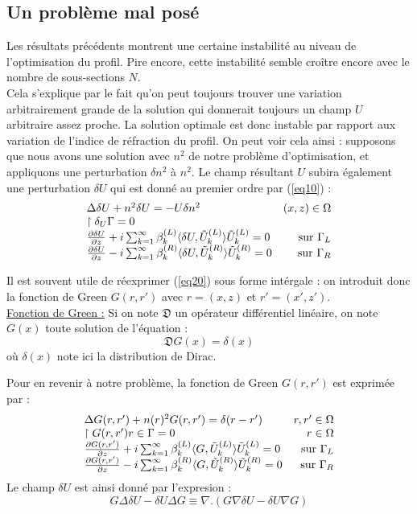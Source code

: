 \documentclass{article}
\begin{document}
\subsection{Un problème mal posé}
Les résultats précédents montrent une certaine instabilité au niveau de l'optimisation du profil. Pire encore, cette instabilité semble croître encore avec le nombre de sous-sections $N$.\\
Cela s'explique par le fait qu'on peut toujours trouver une variation arbitrairement grande de la solution qui donnerait toujours un champ $U$ arbitraire assez proche. La solution optimale est donc instable par rapport aux variation de l'indice de réfraction du profil.
On peut voir cela ainsi : supposons que nous avons une solution avec $n^2$ de notre problème d'optimisation, et appliquons une perturbation $\delta n^2$ à $n^2$. Le champ résultant $U$ subira également une perturbation $\delta U$ qui est donné au premier ordre par (\ref{eq10}) :
\begin{equation}\label{eq20}
\begin{array}{l r}
\Delta\delta U + n^2\delta U=-U\delta n^2 & (x,z)\in\Omega\\
\restriction{\delta_U}{\Gamma}=0\\
\frac{\partial \delta U}{\partial z} + i\sum_{k=1}^\infty \beta_k^{(L)}\langle \delta U,\tilde{U}_k^{(L)}\rangle \tilde{U}_k^{(L)} = 0 & \text{ sur }\Gamma_L\\
\frac{\partial \delta U}{\partial z} - i\sum_{k=1}^\infty \beta_k^{(R)}\langle \delta U,\tilde{U}_k^{(R)}\rangle \tilde{U}_k^{(R)} = 0 & \text{ sur }\Gamma_R\\
\end{array}
\end{equation}

Il est souvent utile de réexprimer (\ref{eq20}) sous forme intérgale : on introduit donc la fonction de Green $G(r,r')$ avec $r=(x,z)$ et $r'=(x',z')$.\\
\underline{Fonction de Green :} Si on note $\mathfrak{D}$ un opérateur différentiel linéaire, on note $G(x)$ toute solution de l'équation : 
\[\mathfrak{D} G(x)=\delta(x)\]
où $\delta(x)$ note ici la distribution de Dirac.

\bigskip
Pour en revenir à notre problème, la fonction de Green $G(r,r')$ est exprimée par :
\begin{equation}\label{eq21}
\begin{array}{l r}
\Delta G(r,r')+n(r)^2G(r,r')=\delta(r-r') & r,r'\in\Omega\\
\restriction{G(r,r')}{r\in\Gamma}=0 & r\in\Omega\\
\frac{\partial G(r,r')}{\partial z} + i\sum_{k=1}^\infty \beta_k^{(L)}\langle G,\tilde{U}_k^{(L)}\rangle \tilde{U}_k^{(L)} = 0 & \text{ sur }\Gamma_L\\
\frac{\partial G(r,r')}{\partial z} - i\sum_{k=1}^\infty \beta_k^{(R)}\langle G,\tilde{U}_k^{(R)}\rangle \tilde{U}_k^{(R)} = 0 & \text{ sur }\Gamma_R\\
\end{array}\end{equation}
Le champ $\delta U$ est ainsi donné par l'expresion : 
\[G\Delta\delta U - \delta U\Delta G\equiv \nabla .(G\nabla\delta U - \delta U\nabla G)\]
\end{document}

